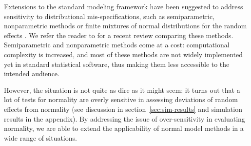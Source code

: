 \documentclass[12pt]{article} %
\newcommand{\hh}[1]{{\color{orange} #1}}
\newcommand{\al}[1]{{\color{red} #1}}
\begin{document}


\hh{Extensions to the standard modeling framework have been suggested to address sensitivity to distributional mis-specifications, such as semiparametric, nonparametric methods \citep{Shen:1999gd, Zhang:2001wo, Ghidey:2004id} or  finite mixtures of normal distributions for the random effects \citep{Verbeke:1996va}. 
}
We refer the reader to \cite{Ghidey:2010de} for a recent review comparing these methods. 
\hh{Semiparametric and nonparametric methods come at a cost: computational complexity is increased, and most of these methods are not widely implemented yet in standard statistical software, thus making them less accessible to the intended audience. }

\hh{However, the situation is not quite as dire as it might seem: it turns out that a lot of tests for normality are overly sensitive in assessing deviations of random effects from normality (see discussion in section~\ref{sec:sim-results} and simulation results in the appendix). By addressing the issue of over-sensitivity in evaluating normality, we are able to extend the applicability of normal model methods in a wide range of situations.}
\end{document}
